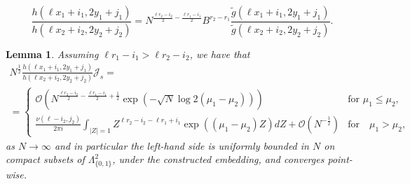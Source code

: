 \documentclass[10pt,a4paper]{amsart}
\newtheorem{lemma}{Lemma}
\begin{document}
\begin{equation}\label{eqn:gauge_proof_coordinates}
\frac{h(\ell x_1+i_1,2y_1+j_1)}{h(\ell x_2+i_2,2y_2+j_2)}
=N^{\frac{\ell r_2-i_2}{2}-\frac{\ell r_1-i_1}{2}} 
B^{r_2-r_1}
\frac{\tilde g(\ell x_1+i_1,2y_1+j_1)}{\tilde g(\ell x_2+i_2,2y_2+j_2)}.
\end{equation}

\begin{lemma}%
\label{lemma:Js}
Assuming $\ell r_1-i_1> \ell r_2-i_2$, we have that 
\begin{multline}
N^{\frac{1}{2}}
\frac{h(\ell x_1+i_1,2y_1+j_1)}{h(\ell x_2+i_2,2y_2+j_2)}
 \mathcal{J}_{s}=
%
%
%
\\=\begin{cases}
\mathcal{O}
\left(N^{\frac{\ell r_2-i_2}{2}-\frac{\ell r_1-i_1}{2}+\frac{1}{2}} \exp\left(-\sqrt{N}\log 2(\mu_1-\mu_2)\right)\right) 
 &\text{for } \mu_1 \leq \mu_2,
\\
\frac{\nu(\ell-i_2,j_2)}{2\pi i}
%
%
\int_{|Z|=1} 
  Z^{\ell r_2-i_2-\ell r_1+i_1}
\exp((\mu_1-\mu_2) Z)
dZ
+
%
\mathcal{O}\left(N^{-\frac{1}{2}}\right)
&\text{for} \quad \mu_1>\mu_2,
\end{cases}
\end{multline}
as $N\rightarrow\infty$ and in particular the left-hand side is uniformly bounded in $N$ on compact subsets of $\Lambda_{\{0,1\}}^2$, under the constructed embedding, and converges point-wise.
%
%
\end{lemma}
\end{document}
